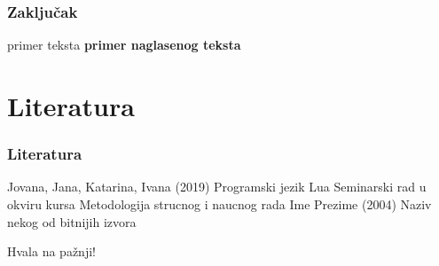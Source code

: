 \documentclass{beamer}
\begin{document}
\begin{frame}
\frametitle{Zaključak}

\begin{block}{primer teksta}
\textbf{primer naglasenog teksta}
\end{block}

\end{frame}


\section{Literatura}

\begin{frame}
\frametitle{Literatura}

\footnotesize{
\begin{thebibliography}{99}
 Jovana, Jana, Katarina, Ivana (2019)
\newblock Programski jezik Lua \small{Seminarski rad u okviru kursa Metodologija strucnog i naucnog rada}
 Ime Prezime (2004)
\newblock Naziv nekog od bitnijih izvora
\end{thebibliography}
}
\end{frame}


\begin{frame}
\Huge{\centerline{Hvala na pažnji!}}
\end{frame}

\end{document}
